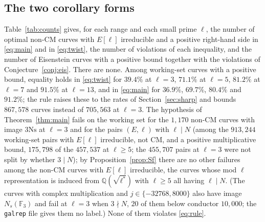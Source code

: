\documentclass[11pt]{amsart}
\theoremstyle{definition}
\newcommand{\Q}{\mathbb{Q}}
\newcommand{\F}{\mathbb{F}}
\newcommand{\Ns}{3\mathrm{Ns}}
\begin{document}
\subsection{The two corollary forms}\label{sec:forms}
Table~\ref{tab:counts} gives, for each range and each small prime $\ell$, the number of optimal non-CM curves with $E[\ell]$ irreducible and a positive right-hand side in \eqref{eq:main} and in \eqref{eq:twist}, the number of violations of each inequality, and the number of Eisenstein curves with a positive bound together with the violations of Conjecture~\ref{conj:eis}. There are none. Among working-set curves with a positive bound, equality holds in \eqref{eq:twist} for $39.4\%$ at $\ell=3$, $71.1\%$ at $\ell=5$, $81.2\%$ at $\ell=7$ and $91.5\%$ at $\ell=13$, and in \eqref{eq:main} for $36.9\%$, $69.7\%$, $80.4\%$ and $91.2\%$; the rule raises these to the rates of Section~\ref{sec:sharp} and bounds $867{,}578$ curves instead of $705{,}563$ at $\ell=3$. The hypothesis of Theorem~\ref{thm:main} fails on the working set for the $1{,}170$ non-CM curves with image $\Ns$ at $\ell=3$ and for the pairs $(E,\ell)$ with $\ell\mid N$ (among the $913{,}244$ working-set pairs with $E[\ell]$ irreducible, not CM, and a positive multiplicative bound, $175{,}798$ of the $457{,}537$ at $\ell\ge5$; the $455{,}707$ pairs at $\ell=3$ were not split by whether $3\mid N$); by Proposition~\ref{prop:Sf} there are no other failures among the non-CM curves with $E[\ell]$ irreducible, the curves whose mod $\ell$ representation is induced from $\Q(\sqrt{\ell^*})$ with $\ell\ge5$ all having $\ell\mid N$. (The curves with complex multiplication and $j\in\{-32768,8000\}$ also have image $N_s(\F_3)$ and fail at $\ell=3$ when $3\nmid N$, $20$ of them below conductor $10{,}000$; the \texttt{galrep} file gives them no label.) None of them violates \eqref{eq:rule}.
\end{document}
